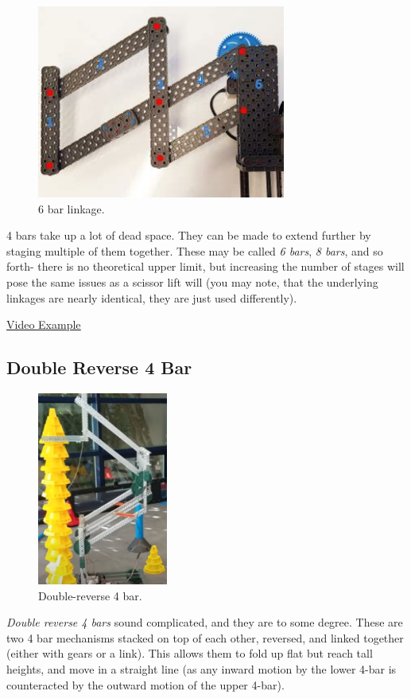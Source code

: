 \begin{figure}[H]
	\includegraphics[height=2.5in]{imgs/6bar.jpeg}
	\caption{6 bar linkage.}
\end{figure}

4 bars take up a lot of dead space. They can be made to extend further by staging multiple of them together. These may be called \textit{6 bars}, \textit{8 bars}, and so forth- there is no theoretical upper limit, but increasing the number of stages will pose the same issues as a scissor lift will (you may note, that the underlying linkages are nearly identical, they are just used differently).

\href{https://www.youtube.com/watch?v=twwNv4easgk}{\color{red}\underline{Video Example}}

\subsection{Double Reverse 4 Bar}

\begin{figure}[H]
	\includegraphics[height=2.5in]{imgs/double_reverse_4bar.png}
	\caption{Double-reverse 4 bar.}
\end{figure}

\textit{Double reverse 4 bars} sound complicated, and they are to some degree. These are two 4 bar mechanisms stacked on top of each other, reversed, and linked together (either with gears or a link). This allows them to fold up flat but reach tall heights, and move in a straight line (as any inward motion by the lower 4-bar is counteracted by the outward motion of the upper 4-bar).

